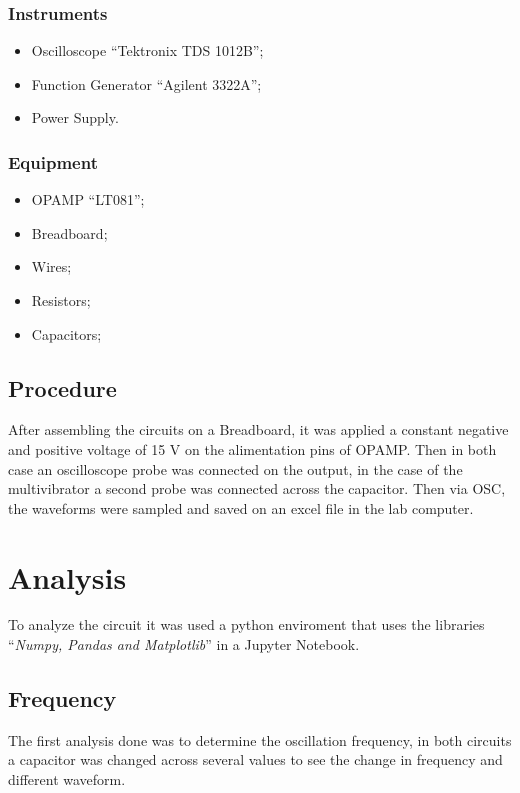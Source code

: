 \documentclass[a4paper, twocolumn]{article}
\begin{document}
\subsubsection{Instruments}
\begin{itemize}
    \item Oscilloscope ``Tektronix TDS 1012B'';
    \item Function Generator ``Agilent 3322A'';
    \item Power Supply.
\end{itemize}
\subsubsection{Equipment}
\begin{itemize}
    \item OPAMP ``LT081'';
    \item Breadboard;
    \item Wires;
    \item Resistors;
    \item Capacitors;
\end{itemize}

\subsection{Procedure}

After assembling the circuits on a Breadboard, it was applied a constant negative and positive voltage of 15 V on the alimentation pins of OPAMP. Then in both case an oscilloscope probe was connected on the output, in the case of the multivibrator a second probe was connected across the capacitor.  Then via OSC, the waveforms were sampled and saved on an excel file in the lab computer. 

\section{Analysis}

To analyze the circuit it was used a python enviroment that uses the libraries ``\emph{Numpy, Pandas and Matplotlib}'' in a Jupyter Notebook. 

\subsection{Frequency}

The first analysis done was to determine the oscillation frequency, in both circuits a capacitor was changed across several values to see the change in frequency and different waveform.
\end{document}
